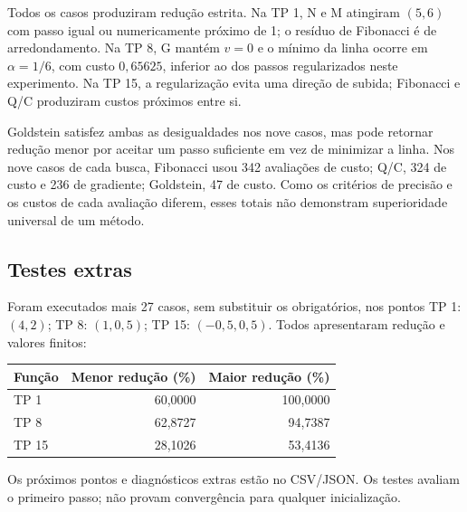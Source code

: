 \documentclass[12pt,a4paper]{article}
\begin{document}
Todos os casos produziram redução estrita. Na TP 1, N e M atingiram
$(5,6)$ com passo igual ou numericamente próximo de 1; o resíduo de
Fibonacci é de arredondamento. Na TP 8, G mantém $v=0$ e o mínimo da linha
ocorre em $\alpha=1/6$, com custo $0{,}65625$, inferior ao dos passos
regularizados neste experimento. Na TP 15, a regularização evita uma
direção de subida; Fibonacci e Q/C produziram custos próximos entre si.

Goldstein satisfez ambas as desigualdades nos nove casos, mas pode retornar
redução menor por aceitar um passo suficiente em vez de minimizar a linha.
Nos nove casos de cada busca, Fibonacci usou 342 avaliações de custo;
Q/C, 324 de custo e 236 de gradiente; Goldstein, 47 de custo.
Como os critérios de precisão e os custos de cada avaliação diferem,
esses totais não demonstram superioridade universal de um método.

\subsection{Testes extras}
Foram executados mais 27 casos, sem substituir os obrigatórios, nos pontos
TP 1: $(4,2)$; TP 8: $(1,0{,}5)$; TP 15: $(-0{,}5,0{,}5)$.
Todos apresentaram redução e valores finitos:
\begin{center}
\begin{tabular}{lrr}
\toprule
Função & Menor redução (\%) & Maior redução (\%)\\
\midrule
TP 1 & 60,0000 & 100,0000\\
TP 8 & 62,8727 & 94,7387\\
TP 15 & 28,1026 & 53,4136\\
\bottomrule
\end{tabular}
\end{center}
Os próximos pontos e diagnósticos extras estão no CSV/JSON. Os testes
avaliam o primeiro passo; não provam convergência para qualquer inicialização.
\end{document}
